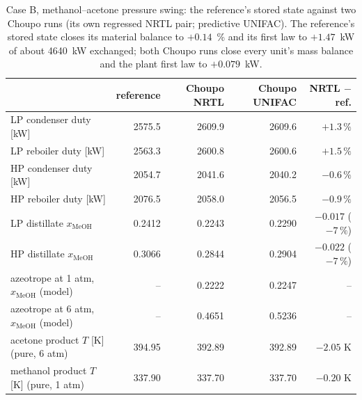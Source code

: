 \documentclass[11pt,a4paper]{article}
\begin{document}
\begin{table}[htbp]
\centering\scriptsize
\caption{Case B, methanol--acetone pressure swing: the reference's stored
state against two Choupo runs (its own regressed NRTL pair; predictive
UNIFAC).  The reference's stored state closes its material balance to
$+0.14$~\% and its first law to $+1.47$~kW of about 4640~kW exchanged; both
Choupo runs close every unit's mass balance and the plant first law to
$+0.079$~kW.}
\label{tab:caseB}
\begin{tabular}{lrrrr}
\toprule
 & \textbf{reference} & \textbf{Choupo NRTL} & \textbf{Choupo UNIFAC} & \textbf{NRTL $-$ ref.} \\
\midrule
LP condenser duty [kW]            & 2575.5 & 2609.9 & 2609.6 & $+1.3\,\%$ \\
LP reboiler duty [kW]             & 2563.3 & 2600.8 & 2600.6 & $+1.5\,\%$ \\
HP condenser duty [kW]            & 2054.7 & 2041.6 & 2040.2 & $-0.6\,\%$ \\
HP reboiler duty [kW]             & 2076.5 & 2058.0 & 2056.5 & $-0.9\,\%$ \\
LP distillate $x_\mathrm{MeOH}$   & 0.2412 & 0.2243 & 0.2290 & $-0.017$ ($-7\,\%$) \\
HP distillate $x_\mathrm{MeOH}$   & 0.3066 & 0.2844 & 0.2904 & $-0.022$ ($-7\,\%$) \\
azeotrope at 1 atm, $x_\mathrm{MeOH}$ (model) & -- & 0.2222 & 0.2247 & -- \\
azeotrope at 6 atm, $x_\mathrm{MeOH}$ (model) & -- & 0.4651 & 0.5236 & -- \\
acetone product $T$ [K] (pure, 6 atm) & 394.95 & 392.89 & 392.89 & $-2.05$ K \\
methanol product $T$ [K] (pure, 1 atm) & 337.90 & 337.70 & 337.70 & $-0.20$ K \\
\bottomrule
\end{tabular}
\end{table}
\end{document}

